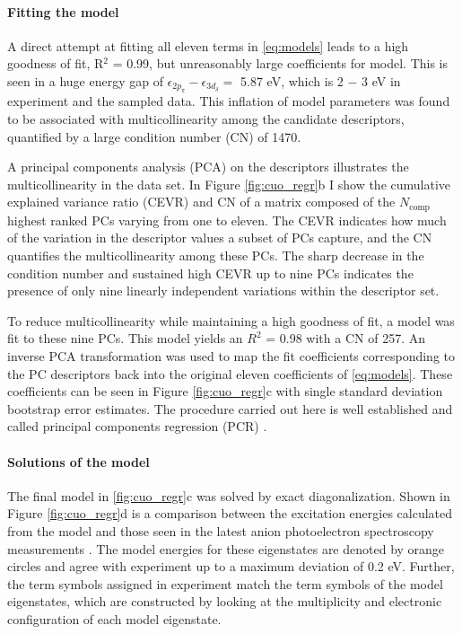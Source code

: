 \documentclass[12pt]{article}
\begin{document}
\vspace{-10pt}
\paragraph{Fitting the model}
A direct attempt at fitting all eleven terms in \eqref{eq:models} leads to a high goodness of fit, R$^2$ = 0.99, but unreasonably large coefficients for model.
This is seen in a huge energy gap of $\epsilon_{2p_\pi} - \epsilon_{3d_\delta} = $ 5.87 eV, which is 2 $-$ 3 eV in experiment and the sampled data.
This inflation of model parameters was found to be associated with multicollinearity among the candidate descriptors, quantified by a large condition number (CN) of 1470.

A principal components analysis (PCA) on the descriptors illustrates the multicollinearity in the data set.
In Figure \eqref{fig:cuo_regr}b I show the cumulative explained variance ratio (CEVR) and CN of a matrix composed of the $N_\text{comp}$ highest ranked PCs varying from one to eleven.
The CEVR indicates how much of the variation in the descriptor values a subset of PCs capture, and the CN quantifies the multicollinearity among these PCs.
The sharp decrease in the condition number and sustained high CEVR up to nine PCs indicates the presence of only nine linearly independent variations within the descriptor set.

To reduce multicollinearity while maintaining a high goodness of fit, a model was fit to these nine PCs.
This model yields an $R^2$ = 0.98 with a CN of 257.
An inverse PCA transformation was used to map the fit coefficients corresponding to the PC descriptors back into the original eleven coefficients of \eqref{eq:models}.
These coefficients can be seen in Figure \ref{fig:cuo_regr}c with single standard deviation bootstrap error estimates.
The procedure carried out here is well established and called principal components regression (PCR) \cite{10.2307/2348005}.

\vspace{-10pt}
\paragraph{Solutions of the model}
The final model in \ref{fig:cuo_regr}c was solved by exact diagonalization.
Shown in Figure \ref{fig:cuo_regr}d is a comparison between the excitation energies calculated from the model and those seen in the latest anion photoelectron spectroscopy measurements \cite{Wu1997}.
The model energies for these eigenstates are denoted by orange circles and agree with experiment up to a maximum deviation of 0.2 eV.
Further, the term symbols assigned in experiment match the term symbols of the model eigenstates, which are constructed by looking at the multiplicity and electronic configuration of each model eigenstate. 
\end{document}
